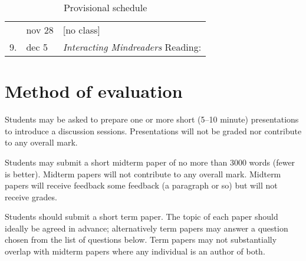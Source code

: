 \documentclass[12pt,\papersize]{extarticle}
\begin{document}
{\begin{table}[htbp]
\begin{center}
\begin{tabular*}{1\textwidth}{ l l m{} }
\\ & nov 28 & [no class]
\\ 9. & dec 5 
	& \textit{Interacting Mindreaders}
		\newline Reading: \citet{Csibra:1998cx,Csibra:2009xr,leekam_adults_2010}
\\
%
\bottomrule
%
\end{tabular*}
\caption{Provisional schedule}
\label{table:schedule}
\end{center}	%
\end{table}
}



\section{Method of evaluation}

Students may be asked to prepare one or more short (5--10 minute) presentations to introduce a discussion sessions. 
Presentations will not be graded nor contribute to any overall mark. 

Students may submit a short midterm paper of no more than 3000 words (fewer is better).
Midterm papers will not contribute to any overall mark.   
Midterm papers will receive feedback some feedback (a paragraph or so) but will not receive grades.

Students should submit a short term paper.  
The topic of each paper should ideally be agreed in advance; alternatively term papers may answer a question chosen from the list of questions below. 
Term papers may not substantially overlap with midterm papers where any individual is an author of both.
\end{document}

